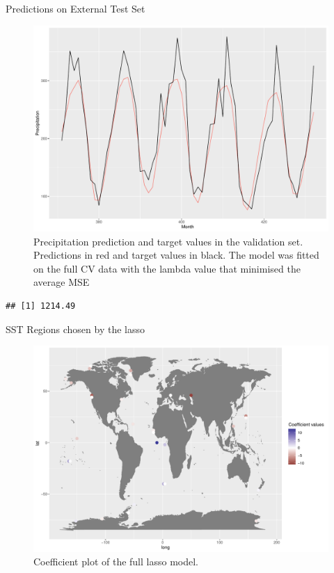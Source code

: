 \documentclass[
  ignorenonframetext,
]{beamer}
\begin{document}
\begin{frame}[fragile]{Predictions on External Test Set}
\begin{figure}

{\centering \includegraphics[width=0.75\linewidth]{ma-presentation_files/figure-beamer/pred-plot-full-lasso-stand-1} 

}

\caption{Precipitation prediction and target values in the validation set. Predictions in red and target values in black. The model was fitted on the full CV data with the lambda value that minimised the average MSE}\label{fig:pred-plot-full-lasso-stand}
\end{figure}

\begin{verbatim}
## [1] 1214.49
\end{verbatim}
\end{frame}

\begin{frame}{SST Regions chosen by the lasso}
\protect\hypertarget{sst-regions-chosen-by-the-lasso}{}
\begin{figure}

{\centering \includegraphics[width=0.75\linewidth]{ma-presentation_files/figure-beamer/coef-plot-full-lasso-stand-1} 

}

\caption{Coefficient plot of the full lasso model.}\label{fig:coef-plot-full-lasso-stand}
\end{figure}
\end{frame}
\end{document}
